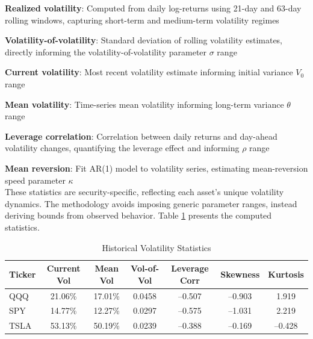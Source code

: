 \documentclass[12pt,a4paper]{article}
\begin{document}
\textbf{Realized volatility}: Computed from daily log-returns using 21-day and 63-day rolling windows, capturing short-term and medium-term volatility regimes

\textbf{Volatility-of-volatility}: Standard deviation of rolling volatility estimates, directly informing the volatility-of-volatility parameter $\sigma$ range

\textbf{Current volatility}: Most recent volatility estimate informing initial variance $V_0$ range

\textbf{Mean volatility}: Time-series mean volatility informing long-term variance $\theta$ range

\textbf{Leverage correlation}: Correlation between daily returns and day-ahead volatility changes, quantifying the leverage effect and informing $\rho$ range

\textbf{Mean reversion}: Fit AR(1) model to volatility series, estimating mean-reversion speed parameter $\kappa$\\

These statistics are security-specific, reflecting each asset's unique volatility dynamics. The methodology avoids imposing generic parameter ranges, instead deriving bounds from observed behavior. Table \ref{tab:vol_stats} presents the computed statistics.

\begin{table}[H]

\centering

\caption{Historical Volatility Statistics}

\label{tab:vol_stats}

\begin{tabular}{lcccccc}

\toprule

\textbf{Ticker} & \textbf{Current Vol} & \textbf{Mean Vol} & \textbf{Vol-of-Vol} & \textbf{Leverage Corr} & \textbf{Skewness} & \textbf{Kurtosis} \\

\midrule

QQQ & 21.06\% & 17.01\% & 0.0458 & --0.507 & --0.903 & 1.919 \\

SPY & 14.77\% & 12.27\% & 0.0297 & --0.575 & --1.031 & 2.219 \\

TSLA & 53.13\% & 50.19\% & 0.0239 & --0.388 & --0.169 & --0.428 \\

\bottomrule

\end{tabular}

\end{table}
\end{document}
